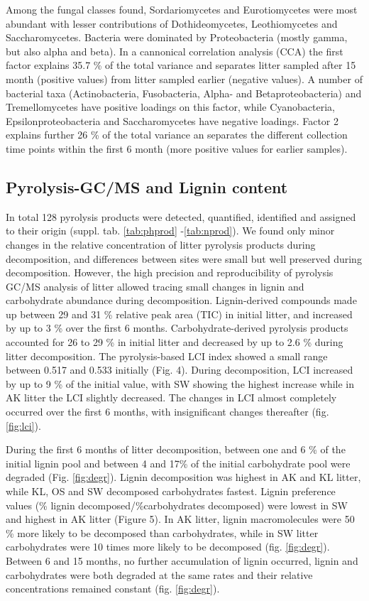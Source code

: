 Among the fungal classes found, Sordariomycetes and Eurotiomycetes were most abundant with lesser contributions of Dothideomycetes, Leothiomycetes and Saccharomycetes. Bacteria were dominated by Proteobacteria (mostly gamma, but also alpha and beta). In a cannonical correlation analysis (CCA) the first factor explains 35.7 \% of the total variance and separates litter sampled after 15 month (positive values) from litter sampled earlier (negative values). A number of bacterial taxa (Actinobacteria, Fusobacteria, Alpha- and Betaproteobacteria) and Tremellomycetes have positive loadings on this factor, while Cyanobacteria, Epsilonproteobacteria and Saccharomycetes have negative loadings. Factor 2 explains further 26 \% of the total variance an separates the different collection time points within the first 6 month (more positive values for earlier samples). 


\subsection*{Pyrolysis-GC/MS and Lignin content}
In total 128 pyrolysis products were detected, quantified, identified and assigned to their origin (suppl. tab. \ref{tab:phprod} -\ref{tab:nprod}). We found only minor changes in the relative concentration of litter pyrolysis products during decomposition, and differences between sites were small but well preserved during decomposition. However, the high precision and reproducibility of pyrolysis GC/MS analysis of litter allowed tracing small changes in lignin and carbohydrate abundance during decomposition. Lignin-derived compounds made up between 29 and 31 \% relative peak area (TIC) in initial litter, and increased by up to 3 \% over the first 6 months. Carbohydrate-derived pyrolysis products accounted for 26 to 29 \% in initial litter and decreased by up to 2.6 \% during litter decomposition. The pyrolysis-based LCI index  showed a small range between 0.517 and 0.533 initially (Fig. 4). During decomposition, LCI increased by up to 9 \% of the initial value, with SW showing the highest increase while in AK litter the LCI slightly decreased. The changes in LCI almost completely occurred over the first 6 months, with insignificant changes thereafter (fig. \ref{fig:lci}).

During the first 6 months of litter decomposition, between one and 6 \% of the initial lignin pool and between 4 and 17\% of the initial carbohydrate pool were degraded (Fig. \ref{fig:degr}). Lignin decomposition was highest in AK and KL litter, while KL, OS and SW decomposed carbohydrates fastest. Lignin preference values (\% lignin decomposed/\%carbohydrates decomposed) were lowest in SW and highest in AK litter (Figure 5). In AK litter, lignin macromolecules were 50 \% more likely to be decomposed than carbohydrates, while in SW litter carbohydrates were 10 times more likely to be decomposed (fig. \ref{fig:degr}). Between 6 and 15 months, no further accumulation of lignin occurred, lignin and carbohydrates were both degraded at the same rates and their relative concentrations remained constant (fig. \ref{fig:degr}).

